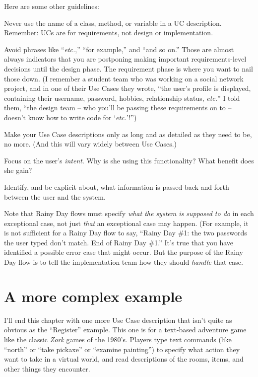Here are some other guidelines:

\begin{compactitem}
\item Never use the name of a class, method, or variable in a UC description.
Remember: UCs are for requirements, not design or implementation.
\item Avoid phrases like ``\textit{etc.},'' ``for example,'' and ``and so
on.'' Those are almost always indicators that you are postponing making
important requirements-level decisions until the design phase. The requirement
phase is where you want to nail those down. (I remember a student team who was
working on a social network project, and in one of their Use Cases they wrote,
``the user's profile is displayed, containing their username, password,
hobbies, relationship status, \textit{etc.}'' I told them, ``the design team
-- who you'll be passing these requirements on to -- doesn't know how to write
code for `\textit{etc.}'!'')
\item Make your Use Case descriptions only as long and as detailed as they
need to be, no more. (And this will vary widely between Use Cases.)
\item Focus on the user's \textit{intent}. Why is she using this
functionality? What benefit does she gain?
\item Identify, and be explicit about, what information is passed back and
forth between the user and the system.
\item Note that Rainy Day flows must specify \textit{what the system is
supposed to do} in each exceptional case, not just \textit{that} an
exceptional case may happen. (For example, it is not sufficient for a Rainy
Day flow to say, ``Rainy Day \#1: the two passwords the user typed don't
match. End of Rainy Day \#1.'' It's true that you have identified a possible
error case that might occur. But the purpose of the Rainy Day flow is to tell
the implementation team how they should \textit{handle} that case.
\end{compactitem}

\section{A more complex example}

I'll end this chapter with one more Use Case description that isn't quite as
obvious as the ``Register'' example. This one is for a text-based adventure
game like the classic \textit{Zork} games of the 1980's. Players type text
commands (like ``north'' or ``take pickaxe'' or ``examine painting'') to
specify what action they want to take in a virtual world, and read
descriptions of the rooms, items, and other things they encounter.

